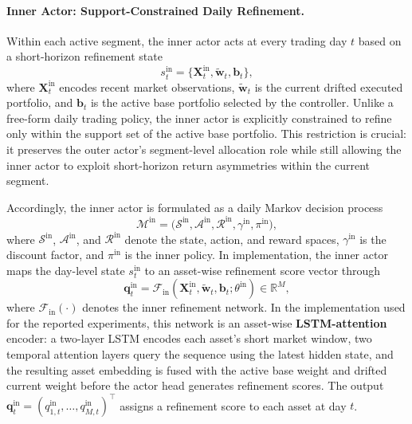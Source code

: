\documentclass[letterpaper]{article} %
\begin{document}
\paragraph{Inner Actor: Support-Constrained Daily Refinement.}
Within each active segment, the inner actor acts at every trading day \(t\) based on a short-horizon refinement state
\[
s_t^{\mathrm{in}}
=
\bigl\{\mathbf{X}^{\mathrm{in}}_t,\tilde{\mathbf{w}}_t,\mathbf{b}_t\bigr\},
\]
where \(\mathbf{X}^{\mathrm{in}}_t\) encodes recent market observations, \(\tilde{\mathbf{w}}_t\) is the current drifted executed portfolio, and \(\mathbf{b}_t\) is the active base portfolio selected by the controller. Unlike a free-form daily trading policy, the inner actor is explicitly constrained to refine only within the support set of the active base portfolio. This restriction is crucial: it preserves the outer actor's segment-level allocation role while still allowing the inner actor to exploit short-horizon return asymmetries within the current segment.

Accordingly, the inner actor is formulated as a daily Markov decision process
\[
\mathcal{M}^{\mathrm{in}}
=
\bigl(
\mathcal{S}^{\mathrm{in}},
\mathcal{A}^{\mathrm{in}},
\mathcal{R}^{\mathrm{in}},
\gamma^{\mathrm{in}},
\pi^{\mathrm{in}}
\bigr),
\]
where \(\mathcal{S}^{\mathrm{in}}\), \(\mathcal{A}^{\mathrm{in}}\), and \(\mathcal{R}^{\mathrm{in}}\) denote the state, action, and reward spaces, \(\gamma^{\mathrm{in}}\) is the discount factor, and \(\pi^{\mathrm{in}}\) is the inner policy. In implementation, the inner actor maps the day-level state \(s_t^{\mathrm{in}}\) to an asset-wise refinement score vector through
\[
\mathbf{q}_t^{\mathrm{in}}
=
\mathcal{F}_{\mathrm{in}}
\!\left(
\mathbf{X}_t^{\mathrm{in}},\tilde{\mathbf{w}}_t,\mathbf{b}_t;
\theta^{\mathrm{in}}
\right)
\in\mathbb{R}^{M},
\]
where \(\mathcal{F}_{\mathrm{in}}(\cdot)\) denotes the inner refinement network. In the implementation used for the reported experiments, this network is an asset-wise \textbf{LSTM-attention} encoder: a two-layer LSTM encodes each asset's short market window, two temporal attention layers query the sequence using the latest hidden state, and the resulting asset embedding is fused with the active base weight and drifted current weight before the actor head generates refinement scores. The output \(\mathbf{q}_t^{\mathrm{in}}=(q_{1,t}^{\mathrm{in}},\dots,q_{M,t}^{\mathrm{in}})^\top\) assigns a refinement score to each asset at day \(t\).
\end{document}
